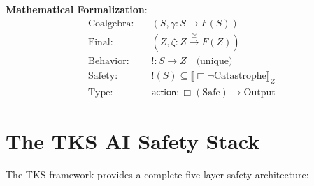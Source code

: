 \documentclass[11pt,twoside]{article}
\theoremstyle{definition}
\theoremstyle{plain}
\theoremstyle{remark}
\newcommand{\sem}[1]{\llbracket #1 \rrbracket}
\begin{document}
\textbf{Mathematical Formalization}:
\begin{equation}
\boxed{
\begin{aligned}
\text{Coalgebra}: & \quad (S, \gamma : S \to F(S)) \\
\text{Final}: & \quad (Z, \zeta : Z \xrightarrow{\cong} F(Z)) \\
\text{Behavior}: & \quad ! : S \to Z \quad \text{(unique)} \\
\text{Safety}: & \quad !(S) \subseteq \sem{\Box \neg \text{Catastrophe}}_Z \\
\text{Type}: & \quad \mathsf{action} : \Box(\text{Safe}) \to \text{Output}
\end{aligned}
}
\end{equation}

\section{The TKS AI Safety Stack}
\label{sec:safety-stack}

The TKS framework provides a complete five-layer safety architecture:
\end{document}
